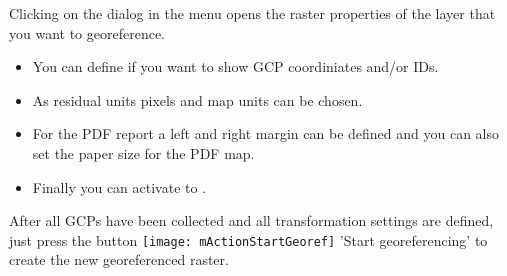 
Clicking on the  dialog in the  menu 
opens the raster properties of the layer that you want to georeference.   


\begin{itemize}[label=--]
\item You can define if you want to show GCP coordiniates and/or IDs.
\item As residual units pixels and map units can be chosen.
\item For the PDF report a left and right margin can be defined and you can 
also set the paper size for the PDF map.
\item Finally you can activate to . 
\end{itemize}

\label{georeferencer_running}

After all GCPs have been collected and all transformation settings are 
defined, just press the button \texttt{[image: mActionStartGeoref]} 
'Start georeferencing' to create the new georeferenced raster.


